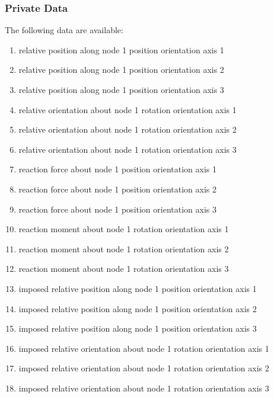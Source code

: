 \subsubsection{Private Data}
The following data are available:
\begin{enumerate}
\item {} relative position along node 1 position orientation axis 1
\item {} relative position along node 1 position orientation axis 2
\item {} relative position along node 1 position orientation axis 3

\item {} relative orientation about node 1 rotation orientation axis 1
\item {} relative orientation about node 1 rotation orientation axis 2
\item {} relative orientation about node 1 rotation orientation axis 3

\item {} reaction force about node 1 position orientation axis 1
\item {} reaction force about node 1 position orientation axis 2
\item {} reaction force about node 1 position orientation axis 3

\item {} reaction moment about node 1 rotation orientation axis 1
\item {} reaction moment about node 1 rotation orientation axis 2
\item {} reaction moment about node 1 rotation orientation axis 3

\item {} imposed relative position along node 1 position orientation axis 1
\item {} imposed relative position along node 1 position orientation axis 2
\item {} imposed relative position along node 1 position orientation axis 3

\item {} imposed relative orientation about node 1 rotation orientation axis 1
\item {} imposed relative orientation about node 1 rotation orientation axis 2
\item {} imposed relative orientation about node 1 rotation orientation axis 3


\end{enumerate}
